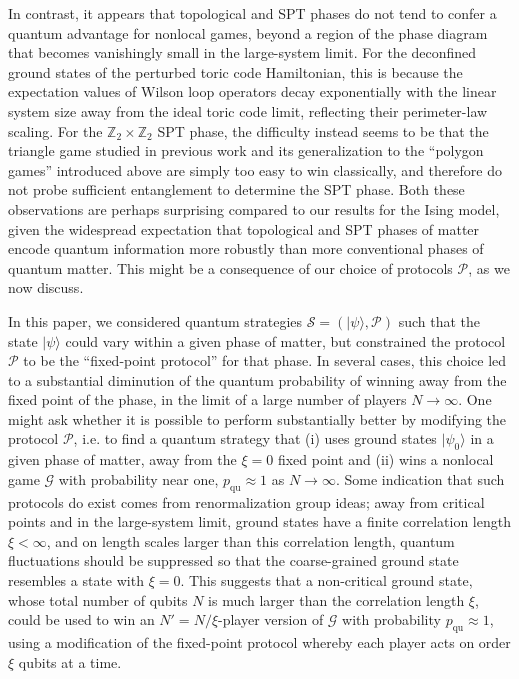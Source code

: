 \documentclass[prb,twocolumn,showpacs,amssymb,superscriptaddress]{revtex4-2}
\begin{document}
In contrast, it appears that topological and SPT phases do not tend to confer a quantum advantage for nonlocal games, beyond a region of the phase diagram that becomes vanishingly small in the large-system limit. For the deconfined ground states of the perturbed toric code Hamiltonian, this is because the expectation values of Wilson loop operators decay exponentially with the linear system size away from the ideal toric code limit, reflecting their perimeter-law scaling. For the $\mathbb{Z}_2 \times \mathbb{Z}_2$ SPT phase, the difficulty instead seems to be that the triangle game studied in previous work\cite{DanielMiyake} and its generalization to the ``polygon games'' introduced above are simply too easy to win classically, and therefore do not probe sufficient entanglement to determine the SPT phase. Both these observations are perhaps surprising compared to our results for the Ising model, given the widespread expectation that topological and SPT phases of matter encode quantum information more robustly than more conventional phases of quantum matter\cite{TopQCreview,SPTcomputer}. This might be a consequence of our choice of protocols $\mathcal{P}$, as we now discuss.

In this paper, we considered quantum strategies $\mathcal{S} = (|\psi\rangle,\mathcal{P})$ such that the state $|\psi\rangle$ could vary within a given phase of matter, but constrained the protocol $\mathcal{P}$ to be the ``fixed-point protocol'' for that phase. In several cases, this choice led to a substantial diminution of the quantum probability of winning away from the fixed point of the phase, in the limit of a large number of players $N \to \infty$. One might ask whether it is possible to perform substantially better by modifying the protocol $\mathcal{P}$, i.e. to find a quantum strategy that (i) uses ground states $|\psi_0\rangle$ in a given phase of matter, away from the $\xi=0$ fixed point and (ii) wins a nonlocal game $\mathcal{G}$ with probability near one, $p_{\mathrm{qu}} \approx 1$ as $N \to \infty$. Some indication that such protocols do exist comes from renormalization group ideas\cite{cardy1996scaling,Verstraete}; away from critical points and in the large-system limit, ground states have a finite correlation length $\xi < \infty$, and on length scales larger than this correlation length, quantum fluctuations should be suppressed so that the coarse-grained ground state resembles a state with $\xi=0$. This suggests that a non-critical ground state, whose total number of qubits $N$ is much larger than the correlation length $\xi$, could be used to win an $N' = N/\xi$-player version of $\mathcal{G}$ with probability $p_{\mathrm{qu}} \approx 1$, using a modification of the fixed-point protocol whereby each player acts on order $\xi$ qubits at a time. 
\end{document}
